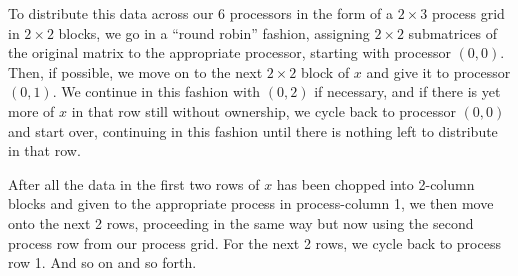 To distribute this data across our 6 processors in the form of a $2\times 3$ process grid in $2\times 2$ blocks, we go in a ``round robin'' fashion, assigning $2\times 2$ submatrices of the original matrix to the appropriate processor, starting with processor $(0, 0)$.  Then, if possible, we move on to the next $2\times 2$ block of $x$ and give it to processor $(0, 1)$.  We continue in this fashion with $(0,2)$ if necessary, and if there is yet more of $x$ in that row still without ownership, we cycle back to processor $(0,0)$ and start over, continuing in this fashion until there is nothing left to distribute in that row.

After all the data in the first two rows of $x$ has been chopped into 2-column blocks and given to the appropriate process in process-column 1, we then move onto the next 2 rows, proceeding in the same way but now using the second process row from our process grid.  For the next 2 rows, we cycle back to process row 1.  And so on and so forth.

